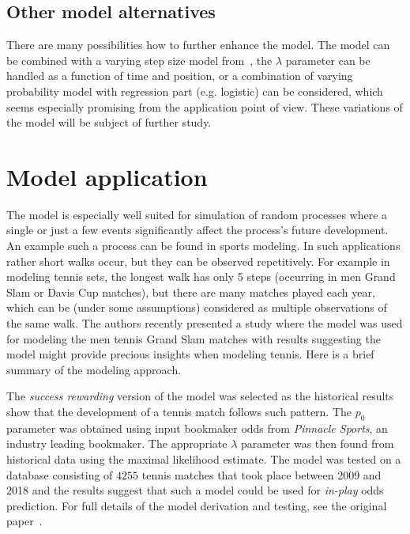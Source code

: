 \documentclass[runningheads]{CMSIM}
\begin{document}
    \subsection{Other model alternatives}\label{subsec:other-model-alternatives}

    There are many possibilities how to further enhance the model.
    The model can be combined with a varying step size model from~\cite{turban2010random},
    the $\lambda$ parameter can be handled as a function of time and position,
    or a combination of varying probability model with regression
    part (e.g. logistic) can be considered, which seems especially promising from the application point of view.
    These variations of the model will be subject of further study.


    \section{Model application}\label{sec:Model-application}

    The model is especially well suited for simulation of random processes where a single or just a few events significantly affect the process's future development.
    An example such a process can be found in sports modeling.
    In such applications rather short walks occur, but they can be observed repetitively.
    For example in modeling tennis sets, the longest walk has only 5 steps (occurring in men Grand Slam or Davis Cup matches), but there are many matches played each year,
    which can be (under some assumptions) considered as multiple observations of the same walk.
    The authors recently presented a study where the model was used for modeling the men tennis Grand Slam matches with results suggesting the model might provide precious insights when modeling tennis.
    Here is a brief summary of the modeling approach.

    The \emph{success rewarding} version of the model was selected as the historical results show that the development of a tennis match follows such pattern.
    The $p_{0}$ parameter was obtained using input bookmaker odds from \emph{Pinnacle Sports}, an industry leading bookmaker.
    The appropriate $\lambda$ parameter was then found from historical data using the maximal likelihood estimate.
    The model was tested on a database consisting of $4255$ tennis matches that took place between 2009 and 2018 and the results suggest that such a model could be used for \emph{in-play} odds prediction.
    For full details of the model derivation and testing, see the original paper~\cite{ja2019mathsport_proc}.
\end{document}
